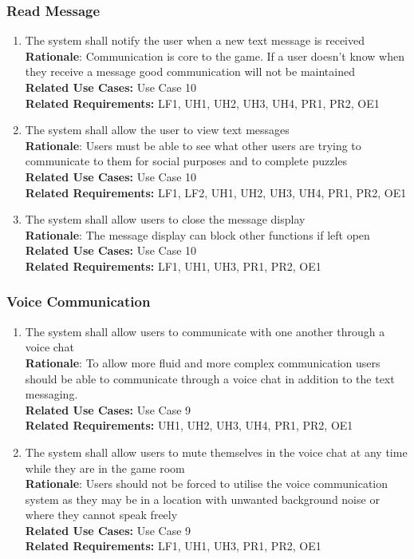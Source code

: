\documentclass[12pt]{article}
\begin{document}
\subsubsection{Read Message}
    \begin{enumerate}[label=RM\arabic*., series=ReadMessage]
        \item The system shall notify the user when a new text message is received\\
        \textbf{Rationale}: Communication is core to the game. If a user doesn't know when they receive a message good communication will not be maintained\\
        \textbf{Related Use Cases:} Use Case 10\\
        \textbf{Related Requirements:} LF1, UH1, UH2, UH3, UH4, PR1, PR2, OE1
        \item The system shall allow the user to view text messages\\
        \textbf{Rationale}: Users must be able to see what other users are trying to communicate to them for social purposes and to complete puzzles\\
        \textbf{Related Use Cases:} Use Case 10\\
        \textbf{Related Requirements:} LF1, LF2, UH1, UH2, UH3, UH4, PR1, PR2, OE1
        \item The system shall allow users to close the message display\\
        \textbf{Rationale}: The message display can block other functions if left open\\
        \textbf{Related Use Cases:} Use Case 10\\
        \textbf{Related Requirements:} LF1, UH1, UH3, PR1, PR2, OE1
    \end{enumerate}
\subsubsection{Voice Communication}
    \begin{enumerate}[label=VM\arabic*., series=VoiceMessage]
        \item The system shall allow users to communicate with one another through a voice chat\\
        \textbf{Rationale}: To allow more fluid and more complex communication users should be able to communicate through a voice chat in addition to the text messaging.\\
        \textbf{Related Use Cases:} Use Case 9\\
        \textbf{Related Requirements:} UH1, UH2, UH3, UH4, PR1, PR2, OE1
        \item The system shall allow users to mute themselves in the voice chat at any time while they are in the game room\\
        \textbf{Rationale}: Users should not be forced to utilise the voice communication system as they may be in a location with unwanted background noise or where they cannot speak freely\\
        \textbf{Related Use Cases:} Use Case 9\\
        \textbf{Related Requirements:} LF1, UH1, UH3, PR1, PR2, OE1
    \end{enumerate}
\end{document}
